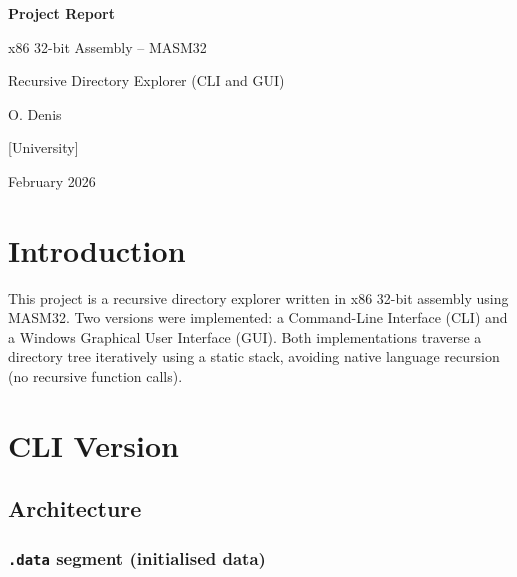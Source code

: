 \documentclass[12pt,a4paper]{article}
\begin{document}
\begin{titlepage}
  \centering
  \vspace*{3cm}
  {\LARGE\bfseries Project Report\par}
  \vspace{0.5cm}
  {\large x86 32-bit Assembly -- MASM32\par}
  \vspace{0.3cm}
  {\large Recursive Directory Explorer (CLI and GUI)\par}
  \vspace{2cm}
  {\normalsize O. Denis\par}
  \vspace{0.3cm}
  {\normalsize [University]\par}
  \vspace{0.3cm}
  {\normalsize February 2026\par}
  \vfill
\end{titlepage}



\section{Introduction}

This project is a recursive directory explorer written in x86 32-bit assembly using MASM32. Two versions were implemented: a Command-Line Interface (CLI) and a Windows Graphical User Interface (GUI). Both implementations traverse a directory tree iteratively using a static stack, avoiding native language recursion (no recursive function calls).

\section{CLI Version}

\subsection{Architecture}

\subsubsection{\texttt{.data} segment (initialised data)}
\end{document}
